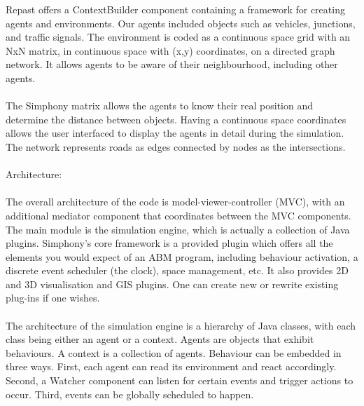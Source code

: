 \documentclass[11pt]{article}
\begin{document}
Repast offers a ContextBuilder component containing a framework for creating agents and environments. Our agents included objects such as vehicles, junctions, and traffic signals. The environment is coded as a continuous space grid with an NxN matrix, in continuous space with (x,y) coordinates, on a directed graph network. It allows agents to be aware of their neighbourhood, including other agents.
\\ \\
The Simphony matrix allows the agents to know their real position and determine the distance between objects. Having a continuous space coordinates allows the user interfaced to display the agents in detail during the simulation. The network represents roads as edges connected by nodes as the intersections.
\\ \\
Architecture:
\\ \\
The overall architecture of the code is model-viewer-controller (MVC), with an additional mediator component that coordinates between the MVC components. The main module is the simulation engine, which is actually a collection of Java plugins. Simphony’s core framework is a provided plugin which offers all the elements you would expect of an ABM program, including behaviour activation, a discrete event scheduler (the clock), space management, etc. It also provides 2D and 3D visualisation and GIS plugins. One can create new or rewrite existing plug-ins if one wishes.
\\ \\
The architecture of the simulation engine is a hierarchy of Java classes, with each class being either an agent or a context. Agents are objects that exhibit behaviours. A context is a collection of agents. Behaviour can be embedded in three ways. First, each agent can read its environment and react accordingly. Second, a Watcher component can listen for certain events and trigger actions to occur. Third, events can be globally scheduled to happen.
\\ \\
\end{document}

